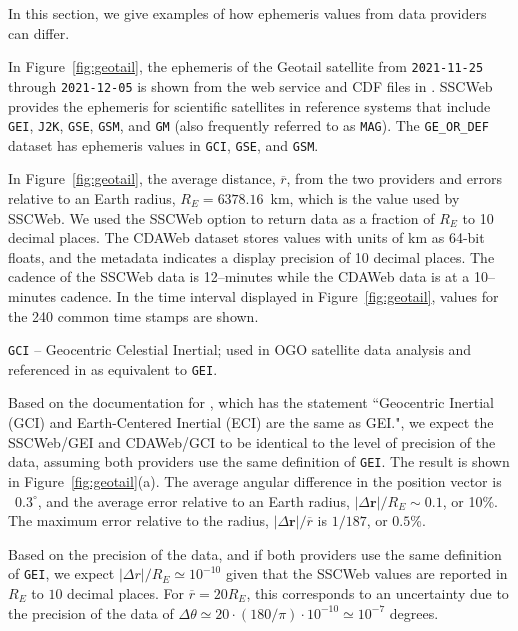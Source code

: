 \documentclass[draft]{agujournal2019}
\begin{document}
In this section, we give examples of how ephemeris values from data providers can differ.

In Figure~\ref{fig:geotail}, the ephemeris of the Geotail satellite from \texttt{2021-11-25} through \texttt{2021-12-05} is shown from the  web service and CDF files in . SSCWeb provides the ephemeris for scientific satellites in reference systems that include \texttt{GEI}, \texttt{J2K}, \texttt{GSE}, \texttt{GSM}, and \texttt{GM} (also frequently referred to as \texttt{MAG}). The \texttt{GE\_OR\_DEF} dataset has ephemeris values in \texttt{GCI}, \texttt{GSE}, and \texttt{GSM}.

In Figure~\ref{fig:geotail}, the average distance, $\overline{r}$, from the two providers and errors relative to an Earth radius, $R_E=6378.16$~km, which is the value used by SSCWeb. We used the SSCWeb option to return data as a fraction of $R_E$ to 10 decimal places. The CDAWeb dataset stores values with units of km as 64-bit floats, and the metadata indicates a display precision of 10 decimal places. The cadence of the SSCWeb data is 12--minutes while the CDAWeb data is at a 10--minutes cadence. In the time interval displayed in Figure~\ref{fig:geotail}, values for the 240 common time stamps are shown.

\texttt{GCI} -- Geocentric Celestial Inertial; used in OGO satellite data analysis \cite{NASA1970} and referenced in  as equivalent to \texttt{GEI}.

Based on the documentation for , which has the statement ``Geocentric Inertial (GCI) and Earth-Centered Inertial (ECI) are the same as GEI.", we expect the SSCWeb/GEI and CDAWeb/GCI to be identical to the level of precision of the data, assuming both providers use the same definition of \texttt{GEI}. The result is shown in Figure~\ref{fig:geotail}(a). The average angular difference in the position vector is ~$0.3^\circ$, and the average error relative to an Earth radius, $|\Delta\mathbf{r}|/R_E\sim 0.1$, or 10\%. The maximum error relative to the radius, $|\Delta \mathbf{r}|/\overline{r}$ is $1/187$, or $0.5$\%.

Based on the precision of the data, and if both providers use the same definition of \texttt{GEI}, we expect $|\Delta r|/R_E \simeq 10^{-10}$ given that the SSCWeb values are reported in $R_E$ to $10$ decimal places. For $\overline{r}=20 R_E$, this corresponds to an uncertainty due to the precision of the data of $\Delta \theta \simeq 20\cdot (180/\pi) \cdot 10^{-10} \simeq 10^{-7}$ degrees.
\end{document}
